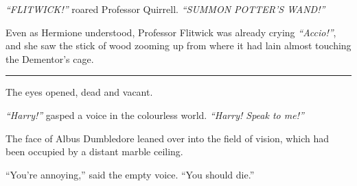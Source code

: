 \emph{``FLITWICK!''} roared Professor Quirrell. \emph{``SUMMON POTTER'S
WAND!''}

Even as Hermione understood, Professor Flitwick was already crying
\emph{``Accio!''}, and she saw the stick of wood zooming up from where
it had lain almost touching the Dementor's cage.

\begin{center}\rule{3in}{0.4pt}\end{center}

The eyes opened, dead and vacant.

\emph{``Harry!''} gasped a voice in the colourless world. \emph{``Harry!
Speak to me!''}

The face of Albus Dumbledore leaned over into the field of vision, which
had been occupied by a distant marble ceiling.

``You're annoying,'' said the empty voice. ``You should die.''
